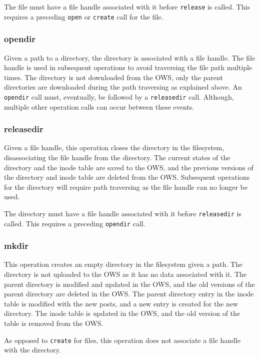 The file must have a file handle associated with it before \texttt{release} is called. This requires a preceding \texttt{open} or \texttt{create} call for the file.

\subsubsection{opendir}
Given a path to a directory, the directory is associated with a file handle. The file handle is used in subsequent operations to avoid traversing the file path multiple times. The directory is not downloaded from the \gls{OWS}, only the parent directories are downloaded during the path traversing as explained above. An \texttt{opendir} call must, eventually, be followed by a \texttt{releasedir} call. Although, multiple other operation calls can occur between these events.

\subsubsection{releasedir}
Given a file handle, this operation closes the directory in the filesystem, disassociating the file handle from the directory. The current states of the directory and the inode table are saved to the \gls{OWS}, and the previous versions of the directory and inode table are deleted from the \gls{OWS}. Subsequent operations for the directory will require path traversing as the file handle can no longer be used.

The directory must have a file handle associated with it before \texttt{releasedir} is called. This requires a preceding \texttt{opendir} call.

\subsubsection{mkdir}
This operation creates an empty directory in the filesystem given a path. The directory is not uploaded to the \gls{OWS} as it has no data associated with it. The parent directory is modified and updated in the \gls{OWS}, and the old versions of the parent directory are deleted in the \gls{OWS}. The parent directory entry in the inode table is modified with the new posts, and a new entry is created for the new directory. The inode table is updated in the \gls{OWS}, and the old version of the table is removed from the \gls{OWS}.

As opposed to \texttt{create} for files, this operation does not associate a file handle with the directory.

